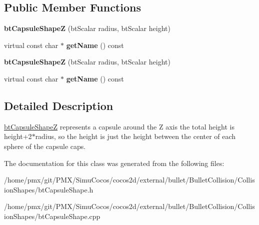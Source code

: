 \subsection*{Public Member Functions}
\begin{DoxyCompactItemize}
\item 
\mbox{\label{classbtCapsuleShapeZ_acb79a1941530fc938a80ddda03373fcd}} 
{\bfseries bt\+Capsule\+ShapeZ} (bt\+Scalar radius, bt\+Scalar height)
\item 
\mbox{\label{classbtCapsuleShapeZ_aa9bdaff89a3989912964ecdcfc7722e5}} 
virtual const char $\ast$ {\bfseries get\+Name} () const
\item 
\mbox{\label{classbtCapsuleShapeZ_acb79a1941530fc938a80ddda03373fcd}} 
{\bfseries bt\+Capsule\+ShapeZ} (bt\+Scalar radius, bt\+Scalar height)
\item 
\mbox{\label{classbtCapsuleShapeZ_aa9bdaff89a3989912964ecdcfc7722e5}} 
virtual const char $\ast$ {\bfseries get\+Name} () const
\end{DoxyCompactItemize}


\subsection{Detailed Description}
\hyperlink{classbtCapsuleShapeZ}{bt\+Capsule\+ShapeZ} represents a capsule around the Z axis the total height is height+2$\ast$radius, so the height is just the height between the center of each \textquotesingle{}sphere\textquotesingle{} of the capsule caps. 

The documentation for this class was generated from the following files\+:\begin{DoxyCompactItemize}
\item 
/home/pmx/git/\+P\+M\+X/\+Simu\+Cocos/cocos2d/external/bullet/\+Bullet\+Collision/\+Collision\+Shapes/bt\+Capsule\+Shape.\+h\item 
/home/pmx/git/\+P\+M\+X/\+Simu\+Cocos/cocos2d/external/bullet/\+Bullet\+Collision/\+Collision\+Shapes/bt\+Capsule\+Shape.\+cpp\end{DoxyCompactItemize}
